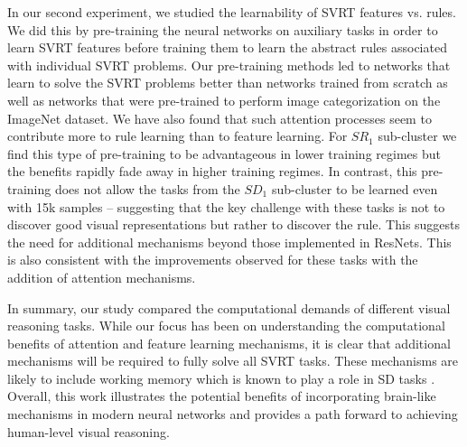 In our second experiment, we studied the learnability of SVRT features vs. rules. We did this by pre-training the neural networks on auxiliary tasks in order to learn SVRT features before training them to learn the abstract rules associated with individual SVRT problems. Our pre-training methods led to networks that learn to solve the SVRT problems better than networks trained from scratch as well as networks that were pre-trained to perform image categorization on the ImageNet dataset. We have also found that such attention processes seem to contribute more to rule learning than to feature learning. For $SR_1$ sub-cluster we find this type of pre-training to be advantageous in lower training regimes but the benefits rapidly fade away in higher training regimes. In contrast, this pre-training does not allow the tasks from the $SD_1$ sub-cluster to be learned even with 15k samples -- suggesting that the key challenge with these tasks is not to discover good visual representations but rather to discover the rule. This suggests the need for additional mechanisms beyond those implemented in ResNets. This is also consistent with the improvements observed for these tasks with the addition of attention mechanisms. 

In summary, our study compared the computational demands of different visual reasoning tasks. While our focus has been on understanding the computational benefits of attention  and feature learning mechanisms, it is clear that additional mechanisms will be required to fully solve all SVRT tasks. These mechanisms are likely to include working memory which is known to play a role in SD tasks \citep{AlamiaENEURO.0267-20.2020}. Overall, this work illustrates the potential benefits of incorporating brain-like mechanisms in modern neural networks and provides a path forward to achieving human-level visual reasoning. 